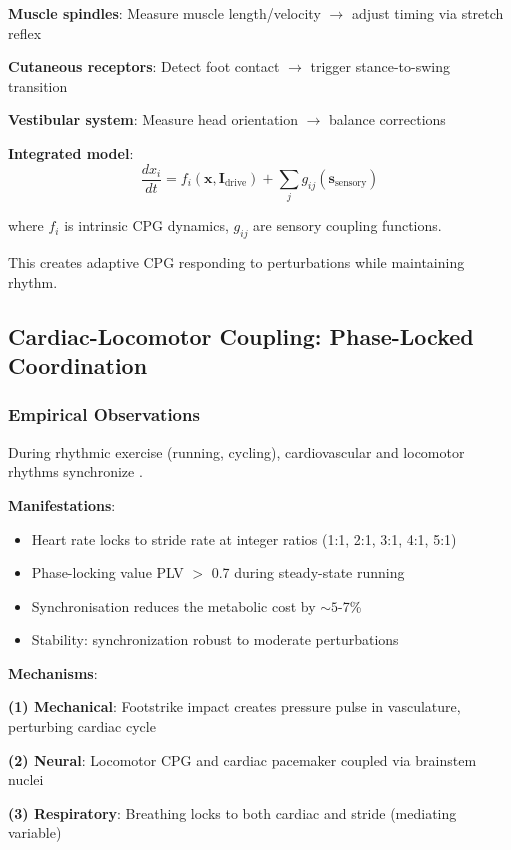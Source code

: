\documentclass[11pt,onecolumn]{article}
\begin{document}
\textbf{Muscle spindles}: Measure muscle length/velocity $\to$ adjust timing via stretch reflex

\textbf{Cutaneous receptors}: Detect foot contact $\to$ trigger stance-to-swing transition

\textbf{Vestibular system}: Measure head orientation $\to$ balance corrections

\textbf{Integrated model}:
\begin{equation}
\frac{dx_i}{dt} = f_i(\mathbf{x}, \mathbf{I}_{\text{drive}}) + \sum_j g_{ij}(\mathbf{s}_{\text{sensory}})
\end{equation}

where $f_i$ is intrinsic CPG dynamics, $g_{ij}$ are sensory coupling functions.

This creates adaptive CPG responding to perturbations while maintaining rhythm.

\subsection{Cardiac-Locomotor Coupling: Phase-Locked Coordination}

\subsubsection{Empirical Observations}

During rhythmic exercise (running, cycling), cardiovascular and locomotor rhythms synchronize \citep{niizeki1993intramuscular}.

\textbf{Manifestations}:
\begin{itemize}
\item Heart rate locks to stride rate at integer ratios (1:1, 2:1, 3:1, 4:1, 5:1)
\item Phase-locking value PLV $>$ 0.7 during steady-state running
\item Synchronisation reduces the metabolic cost by $\sim 5$-7\%
\item Stability: synchronization robust to moderate perturbations
\end{itemize}

\textbf{Mechanisms}:

\textbf{(1) Mechanical}: Footstrike impact creates pressure pulse in vasculature, perturbing cardiac cycle

\textbf{(2) Neural}: Locomotor CPG and cardiac pacemaker coupled via brainstem nuclei

\textbf{(3) Respiratory}: Breathing locks to both cardiac and stride (mediating variable)
\end{document}
